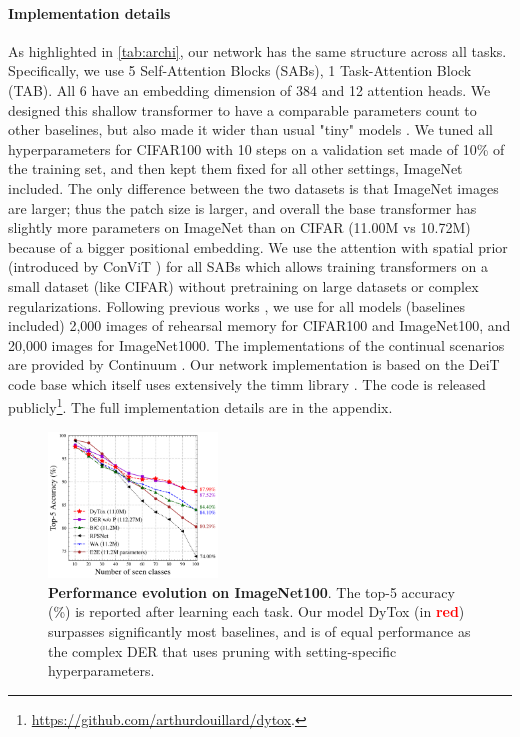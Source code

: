 \paragraph{Implementation details} As highlighted in \autoref{tab:archi}, our network has the same
structure across all tasks. Specifically, we use 5 Self-Attention Blocks (SABs), 1 Task-Attention
Block (TAB). All 6 have an embedding dimension of 384 and 12 attention heads. We designed this
shallow transformer to have a comparable parameters count to other baselines, but also made it wider
than usual "tiny" models \cite{dosovitskiy2020vit,touvron2021deit,touvron2021cait}. We tuned all
hyperparameters for CIFAR100 with 10 steps on a validation set made of 10\% of the training set, and
then kept them fixed for all other settings, ImageNet included. The only difference between the two
datasets is that ImageNet images are larger; thus the patch size is larger, and overall the base
transformer has slightly more parameters on ImageNet than on CIFAR (11.00M vs 10.72M) because of a
bigger positional embedding. We use the attention with spatial prior (introduced by ConViT
\cite{dascoli2021convit}) for all SABs which allows training transformers on a small dataset (like
CIFAR) without pretraining on large datasets or complex regularizations. Following previous works
\cite{rebuffi2017icarl,yan2021der}, we use for all models (baselines included) 2,000 images of
rehearsal memory for CIFAR100 and ImageNet100, and 20,000 images for ImageNet1000. The
implementations of the continual scenarios are provided by Continuum
\cite{douillardlesort2021continuum}. Our network implementation is based on the DeiT
\cite{touvron2021deit} code base which itself uses extensively the timm library
\cite{wightman2019timm}. The code is released
publicly\footnote{\footnotesize{\url{https://github.com/arthurdouillard/dytox}.}}. The full
implementation details are in the appendix.

\begin{figure}
    \centering
    \includegraphics[width=0.40\textwidth]{images/dytox/imagenet100.png}
    \caption{\textbf{Performance evolution on ImageNet100}. The top-5 accuracy (\%) is reported
        after learning each task. Our model DyTox (in \textbf{\textcolor{red}{red}}) surpasses
        significantly most baselines, and is of equal performance as the complex DER that uses pruning
        with setting-specific hyperparameters.\vspace{-1em}}
    \label{fig:dytox_imagenet100}
\end{figure}



